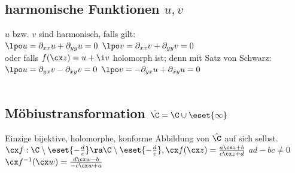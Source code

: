 \documentclass[fs, footer]{latex4ei}
\begin{document}
\begin{sectionbox}
\begin{sectionbox}
\begin{sectionbox}
	\subsection{harmonische Funktionen $u,v$}
	$u$ bzw. $v$ sind harmonisch, falls gilt:\\
	$\lpo u = \partial_{xx} u + \partial_{yy} u = 0$ \qquad\quad $\lpo v = \partial_{xx} v + \partial_{yy} v = 0$\\[0.5em]
	oder falls $f(\cx z) = u + \i v$ holomorph ist; denn mit Satz von Schwarz:\\
	$\lpo u = \partial_{yx} v - \partial_{xy} v = 0$ \qquad\quad $\lpo v = - \partial_{yx} u + \partial_{xy} u = 0$\\
	\\
\end{sectionbox}

\begin{sectionbox}
	\subsection{Möbiustransformation $\hat \C = \C \cup \eset{\infty}$}
	Einzige bijektive, holomorphe, konforme Abbildung von $\hat \C$ auf sich selbst.\\
	$\cx f:\C \setminus \eset{-\frac{d}{c}} \ra \C \setminus \eset{-\frac{d}{c}}, \cx f(\cx z) = \frac{a\cx z + b}{c\cx z + d}$ \qquad $ad - bc \ne 0$\\ 
	$\cx f^{-1}(\cx w) = \frac{d\cx w - b}{-c \cx w + a}$
\end{sectionbox}

\begin{sectionbox}

\end{sectionbox}
\end{sectionbox}
\end{sectionbox}
\end{document}
